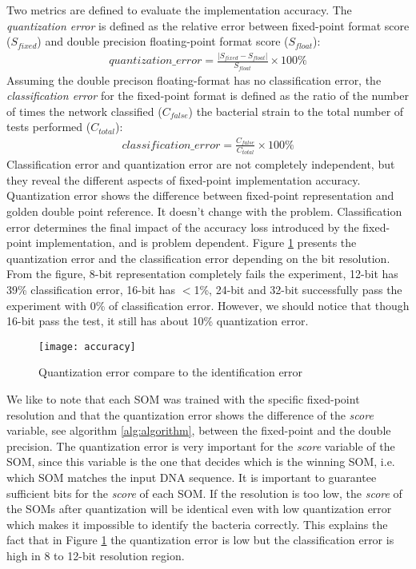 Two metrics are defined to evaluate the implementation accuracy. The \emph{quantization error} is defined as the relative error between fixed-point format score ($S_{fixed}$) and double precision floating-point format score ($S_{float}$):
\begin{align*}
	quantization\_error = \frac{|S_{fixed} - S_{float}|}{S_{float}}\times 100\%
\end{align*}
Assuming the double precison floating-format has no classification error, the \emph{classification error} for the fixed-point format is defined as the ratio of the number of times the network classified ($C_{false}$) the bacterial strain to the total number of tests performed ($C_{total}$):
\begin{align*}
	classification\_error = \frac{C_{false}}{C_{total}}\times 100\%
\end{align*}
Classification error and quantization error are not completely independent, but they reveal the different aspects of fixed-point implementation accuracy. Quantization error shows the difference between fixed-point representation and golden double point reference. It doesn't change with the problem. Classification error determines the final impact of the accuracy loss introduced by the fixed-point implementation, and is problem dependent. Figure \ref{fig:error} presents the quantization error and the classification error depending on the bit resolution. From the figure, 8-bit representation completely fails the experiment, 12-bit has 39\% classification error, 16-bit has $<$1\%, 24-bit and 32-bit successfully pass the experiment with 0\% of classification error. However, we should notice that though 16-bit pass the test, it still has about 10\% quantization error.\par
\begin{figure}[ht]
	\centering
	\texttt{[image: accuracy]}
	\caption{Quantization error compare to the identification error}
	\label{fig:error}
\end{figure}
We like to note that each SOM was trained with the specific fixed-point resolution and that the quantization error shows the difference of the \emph{score} variable, see algorithm \ref{alg:algorithm}, between the fixed-point and the double precision. The quantization error is very important for the \emph{score} variable of the SOM, since this variable is the one that decides which is the winning SOM, i.e. which SOM matches the input DNA sequence. It is important to guarantee sufficient bits for the \emph{score} of each SOM. If the resolution is too low, the \emph{score} of the SOMs after quantization will be identical even with low quantization error which makes it impossible to identify the bacteria correctly. This explains the fact that in Figure \ref{fig:error} the quantization error is low but the classification error is high in 8 to 12-bit resolution region.
